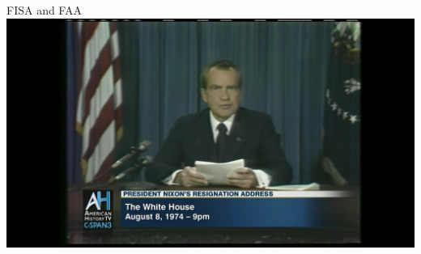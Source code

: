 \documentclass[nobackground,dvipsnames,table,aspectratio=169]{beamer}
\begin{document}
\begin{frame}{}
    \thispagestyle{empty}
\end{frame}

\begin{frame}{FISA and FAA}
    \includegraphics[width=\textwidth]{nixon-resignation}
\end{frame}
\end{document}
